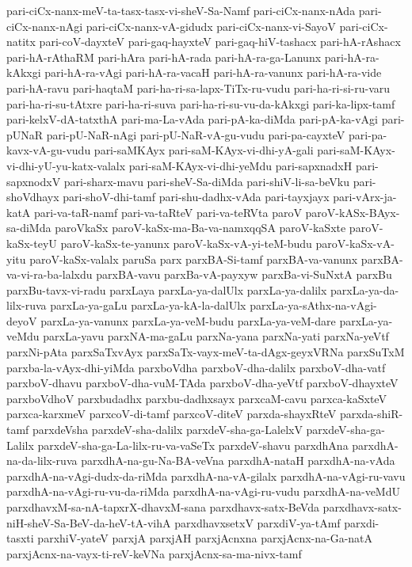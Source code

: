 {pari-ciCx-nanx-meV-ta-tasx-tasx-vi-sheV-Sa-Namf
pari-ciCx-nanx-nAda
pari-ciCx-nanx-nAgi
pari-ciCx-nanx-vA-gidudx
pari-ciCx-nanx-vi-SayoV
pari-ciCx-natitx
pari-coV-dayxteV
pari-gaq-hayxteV
pari-gaq-hiV-tashacx
pari-hA-rAshacx
pari-hA-rAthaRM
pari-hAra
pari-hA-rada
pari-hA-ra-ga-Lanunx
pari-hA-ra-kAkxgi
pari-hA-ra-vAgi
pari-hA-ra-vacaH
pari-hA-ra-vanunx
pari-hA-ra-vide
pari-hA-ravu
pari-haqtaM
pari-ha-ri-sa-lapx-TiTx-ru-vudu
pari-ha-ri-si-ru-varu
pari-ha-ri-su-tAtxre
pari-ha-ri-suva
pari-ha-ri-su-vu-da-kAkxgi
pari-ka-lipx-tamf
pari-kelxV-dA-tatxthA
pari-ma-La-vAda
pari-pA-ka-diMda
pari-pA-ka-vAgi
pari-pUNaR
pari-pU-NaR-nAgi
pari-pU-NaR-vA-gu-vudu
pari-pa-cayxteV
pari-pa-kavx-vA-gu-vudu
pari-saMKAyx
pari-saM-KAyx-vi-dhi-yA-gali
pari-saM-KAyx-vi-dhi-yU-yu-katx-valalx
pari-saM-KAyx-vi-dhi-yeMdu
pari-sapxnadxH
pari-sapxnodxV
pari-sharx-mavu
pari-sheV-Sa-diMda
pari-shiV-li-sa-beVku
pari-shoVdhayx
pari-shoV-dhi-tamf
pari-shu-dadhx-vAda
pari-tayxjayx
pari-vArx-ja-katA
pari-va-taR-namf
pari-va-taRteV
pari-va-teRVta
paroV
paroV-kASx-BAyx-sa-diMda
paroVkaSx
paroV-kaSx-ma-Ba-va-namxqqSA
paroV-kaSxte
paroV-kaSx-teyU
paroV-kaSx-te-yanunx
paroV-kaSx-vA-yi-teM-budu
paroV-kaSx-vA-yitu
paroV-kaSx-valalx
paruSa
parx
parxBA-Si-tamf
parxBA-va-vanunx
parxBA-va-vi-ra-ba-lalxdu
parxBA-vavu
parxBa-vA-payxyw
parxBa-vi-SuNxtA
parxBu
parxBu-tavx-vi-radu
parxLaya
parxLa-ya-dalUlx
parxLa-ya-dalilx
parxLa-ya-da-lilx-ruva
parxLa-ya-gaLu
parxLa-ya-kA-la-dalUlx
parxLa-ya-sAthx-na-vAgi-deyoV
parxLa-ya-vanunx
parxLa-ya-veM-budu
parxLa-ya-veM-dare
parxLa-ya-veMdu
parxLa-yavu
parxNA-ma-gaLu
parxNa-yana
parxNa-yati
parxNa-yeVtf
parxNi-pAta
parxSaTxvAyx
parxSaTx-vayx-meV-ta-dAgx-geyxVRNa
parxSuTxM
parxba-la-vAyx-dhi-yiMda
parxboVdha
parxboV-dha-dalilx
parxboV-dha-vatf
parxboV-dhavu
parxboV-dha-vuM-TAda
parxboV-dha-yeVtf
parxboV-dhayxteV
parxboVdhoV
parxbudadhx
parxbu-dadhxsayx
parxcaM-cavu
parxca-kaSxteV
parxca-karxmeV
parxcoV-di-tamf
parxcoV-diteV
parxda-shayxRteV
parxda-shiR-tamf
parxdeVsha
parxdeV-sha-dalilx
parxdeV-sha-ga-LalelxV
parxdeV-sha-ga-Lalilx
parxdeV-sha-ga-La-lilx-ru-va-vaSeTx
parxdeV-shavu
parxdhAna
parxdhA-na-da-lilx-ruva
parxdhA-na-gu-Na-BA-veVna
parxdhA-nataH
parxdhA-na-vAda
parxdhA-na-vAgi-dudx-da-riMda
parxdhA-na-vA-gilalx
parxdhA-na-vAgi-ru-vavu
parxdhA-na-vAgi-ru-vu-da-riMda
parxdhA-na-vAgi-ru-vudu
parxdhA-na-veMdU
parxdhavxM-sa-nA-tapxrX-dhavxM-sana
parxdhavx-satx-BeVda
parxdhavx-satx-niH-sheV-Sa-BeV-da-heV-tA-vihA
parxdhavxsetxV
parxdiV-ya-tAmf
parxdi-tasxti
parxhiV-yateV
parxjA
parxjAH
parxjAcnxna
parxjAcnx-na-Ga-natA
parxjAcnx-na-vayx-ti-reV-keVNa
parxjAcnx-sa-ma-nivx-tamf
}
